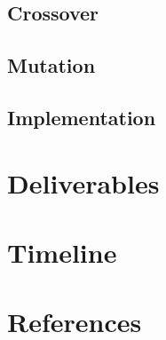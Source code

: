\documentclass[12pt]{article}
\begin{document}
\subsection{Crossover}
\subsection{Mutation}
\subsection{Implementation}
\section{Deliverables}
\section{Timeline}
\section{References}
\end{document}
